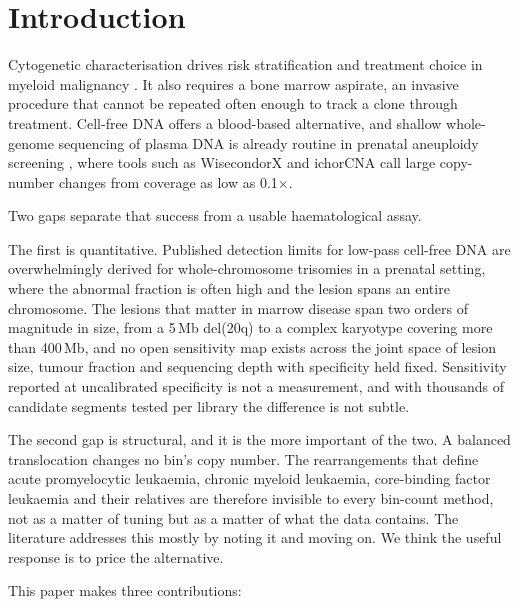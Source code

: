 \documentclass[conference]{IEEEtran}
\begin{document}
\section{Introduction}

Cytogenetic characterisation drives risk stratification and treatment choice in
myeloid malignancy \cite{dohner2022eln, bernard2022ipssm}. It also requires a
bone marrow aspirate, an invasive procedure that cannot be repeated often
enough to track a clone through treatment. Cell-free DNA offers a blood-based
alternative, and shallow whole-genome sequencing of plasma DNA is already
routine in prenatal aneuploidy screening \cite{lo2010maternal,
straver2014wisecondor}, where tools such as WisecondorX
\cite{raman2019wisecondorx} and ichorCNA \cite{adalsteinsson2017ichorcna} call
large copy-number changes from coverage as low as 0.1$\times$.

Two gaps separate that success from a usable haematological assay.

The first is quantitative. Published detection limits for low-pass cell-free
DNA are overwhelmingly derived for whole-chromosome trisomies in a prenatal
setting, where the abnormal fraction is often high and the lesion spans an
entire chromosome. The lesions that matter in marrow disease span two orders of
magnitude in size, from a 5\,Mb del(20q) to a complex karyotype covering more
than 400\,Mb, and no open sensitivity map exists across the joint space of
lesion size, tumour fraction and sequencing depth with specificity held fixed.
Sensitivity reported at uncalibrated specificity is not a measurement, and with
thousands of candidate segments tested per library the difference is not
subtle.

The second gap is structural, and it is the more important of the two. A
balanced translocation changes no bin's copy number. The rearrangements that
define acute promyelocytic leukaemia, chronic myeloid leukaemia, core-binding
factor leukaemia and their relatives \cite{greenberg2017mitelman} are therefore
invisible to every bin-count method, not as a matter of tuning but as a matter
of what the data contains. The literature addresses this mostly by noting it
and moving on. We think the useful response is to price the alternative.

This paper makes three contributions:
\end{document}
